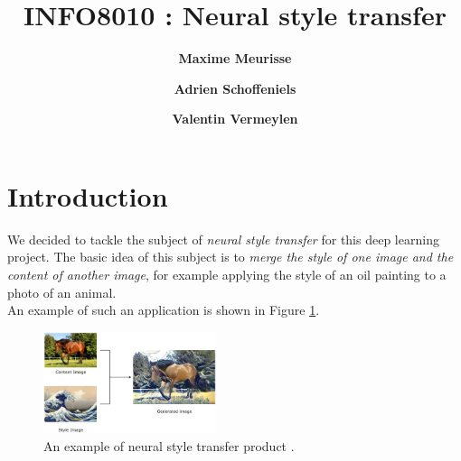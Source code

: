 \documentclass[twocolumn,superscriptaddress,aps, floatfix]{revtex4-1}
\begin{document}
    
    \title{\Large{INFO8010 : Neural style transfer}}
    \vspace{1cm}
    
    \author{\small{\bf Maxime Meurisse}}
    
    \author{\small{\bf Adrien Schoffeniels}}
    
    \author{\small{\bf Valentin Vermeylen}}
    
    \maketitle
    
    
    
    
    \section{Introduction}
    
    We decided to tackle the subject of \emph{neural style transfer} for this deep learning project. The basic idea of this subject is to \emph{merge the style of one image and the content of another image}, for example applying the style of an oil painting to a photo of an animal.\\
    
    An example of such an application is shown in Figure \ref{fig:introduction.example}.\\
    
    \begin{figure}[ht]
        \centering
        \includegraphics[width=0.45\textwidth]{resources/png/example.png}
        \caption{An example of neural style transfer product \cite{towardsdatascience.com}.}
        \label{fig:introduction.example}
    \end{figure}
    
\end{document}
